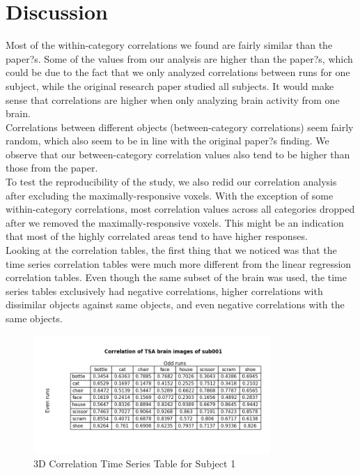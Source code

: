 \documentclass[11pt,twocolumn]{article}
\begin{document}
\section{Discussion}

Most of the within-category correlations we found are fairly similar than the paper?s. 
Some of the values from our analysis are higher than the paper?s, which could be 
due to the fact that we only analyzed correlations between runs for one subject, 
while the original research paper studied all subjects. It would make sense that 
correlations are higher when only analyzing brain activity from one brain. \\

Correlations between different objects (between-category correlations) seem 
fairly random, which also seem to be in line with the original paper?s finding. 
We observe that our between-category correlation values also tend to be higher 
than those from the paper. \\

To test the reproducibility of the study, we also redid our correlation analysis 
after excluding the maximally-responsive voxels. With the exception of some 
within-category correlations, most correlation values across all categories dropped 
after we removed the maximally-responsive voxels. This might be an indication 
that most of the highly correlated areas tend to have higher responses. \\

Looking at the correlation tables, the first thing that we noticed was that
the time series correlation tables were much more different from the linear
regression correlation tables. Even though the same subset of the brain was 
used, the time series tables exclusively had negative correlations, higher 
correlations with dissimilar objects against same objects, and even negative
correlations with the same objects. \\

\begin{figure}[h!]                                                              
\centering                                                                      
\includegraphics[width=90mm]{subtracted_correlation_table_sub001.png}                   
\caption{3D Correlation Time Series Table for Subject 1}                                    
\end{figure}
\end{document}
